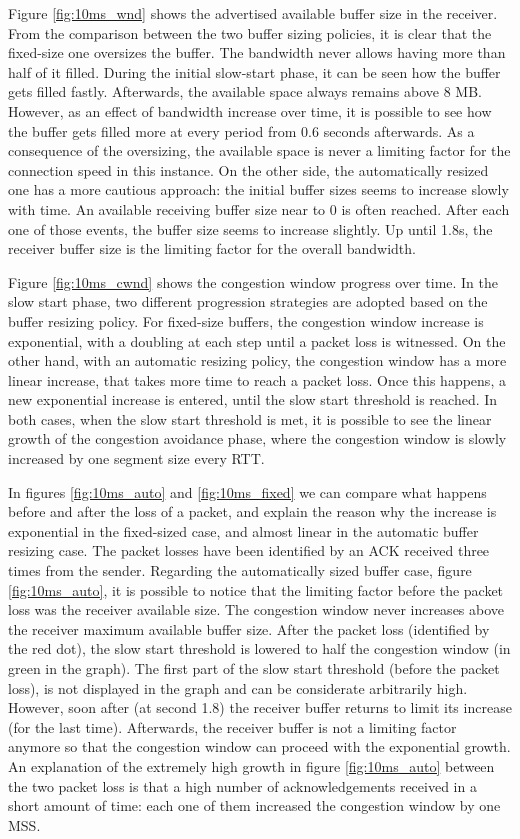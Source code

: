 \documentclass[a4paper,10pt]{article}
\begin{document}
Figure \ref{fig:10ms_wnd} shows the advertised available buffer size in the receiver. From the comparison between the two buffer sizing policies, it is clear that the fixed-size one oversizes the buffer. The bandwidth never allows having more than half of it filled. During the initial slow-start phase, it can be seen how the buffer gets filled fastly. Afterwards, the available space always remains above 8 MB. However, as an effect of bandwidth increase over time, it is possible to see how the buffer gets filled more at every period from 0.6 seconds afterwards. As a consequence of the oversizing, the available space is never a limiting factor for the connection speed in this instance. 
On the other side, the automatically resized one has a more cautious approach: the initial buffer sizes seems to increase slowly with time. An available receiving buffer size near to 0 is often reached. After each one of those events, the buffer size seems to increase slightly. Up until 1.8s, the receiver buffer size is the limiting factor for the overall bandwidth. 

Figure \ref{fig:10ms_cwnd} shows the congestion window progress over time. In the slow start phase, two different progression strategies are adopted based on the buffer resizing policy. For fixed-size buffers, the congestion window increase is exponential, with a doubling at each step until a packet loss is witnessed. On the other hand, with an automatic resizing policy, the congestion window has a more linear increase, that takes more time to reach a packet loss. Once this happens, a new exponential increase is entered, until the slow start threshold is reached.
In both cases, when the slow start threshold is met, it is possible to see the linear growth of the congestion avoidance phase, where the congestion window is slowly increased by one segment size every RTT.

In figures \ref{fig:10ms_auto} and \ref{fig:10ms_fixed} we can compare what happens before and after the loss of a packet, and explain the reason why the increase is exponential in the fixed-sized case, and almost linear in the automatic buffer resizing case. 
The packet losses have been identified by an ACK received three times from the sender. 
Regarding the automatically sized buffer case, figure \ref{fig:10ms_auto}, it is possible to notice that the limiting factor before the packet loss was the receiver available size. The congestion window never increases above the receiver maximum available buffer size. After the packet loss (identified by the red dot), the slow start threshold is lowered to half the congestion window (in green in the graph). The first part of the slow start threshold (before the packet loss), is not displayed in the graph and can be considerate arbitrarily high. However, soon after (at second 1.8) the receiver buffer returns to limit its increase (for the last time). Afterwards, the receiver buffer is not a limiting factor anymore so that the congestion window can proceed with the exponential growth.
An explanation of the extremely high growth in figure \ref{fig:10ms_auto} between the two packet loss is that a high number of acknowledgements received in a short amount of time: each one of them increased the congestion window by one MSS.
\end{document}
